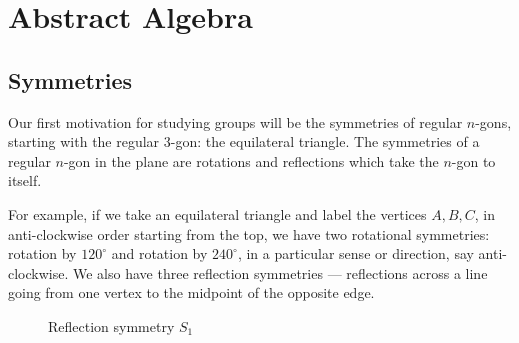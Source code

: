 \chapter{Abstract Algebra}
\label{ch:abstract}

\section{Symmetries}

Our first motivation for studying groups will be the symmetries of regular $n$-gons, starting with the regular $3$-gon: the equilateral triangle. The symmetries of a regular $n$-gon in the plane are rotations and reflections which take the $n$-gon to itself.

For example, if we take an equilateral triangle and label the vertices $A, B, C$, in anti-clockwise order starting from the top, we have two rotational symmetries: rotation by $120^\circ$ and rotation by $240^\circ$, in a particular sense or direction, say anti-clockwise. We also have three reflection symmetries --- reflections across a line going from one vertex to the midpoint of the opposite edge.

\begin{figure}[ht!]
    \centering
\caption{Reflection symmetry $S_1$}
\label{fig:triangle-reflection}
\end{figure}

